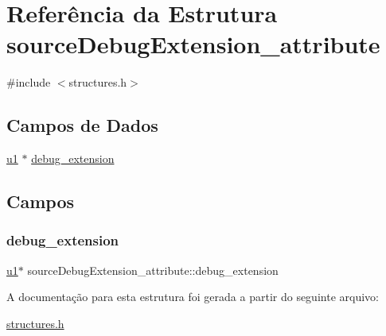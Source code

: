 \hypertarget{structsourceDebugExtension__attribute}{}\section{Referência da Estrutura source\+Debug\+Extension\+\_\+attribute}
\label{structsourceDebugExtension__attribute}


{\ttfamily \#include $<$structures.\+h$>$}

\subsection*{Campos de Dados}
\begin{DoxyCompactItemize}
\item 
\hyperlink{lista__operandos_8h_ad9f4cdb6757615aae2fad89dab3c5470}{u1} $\ast$ \hyperlink{structsourceDebugExtension__attribute_a55b08753a7cc09bf7ca9e4b526445d7f}{debug\+\_\+extension}
\end{DoxyCompactItemize}


\subsection{Campos}
\mbox{\label{structsourceDebugExtension__attribute_a55b08753a7cc09bf7ca9e4b526445d7f}} 
\subsubsection{\texorpdfstring{debug\+\_\+extension}{debug\_extension}}
{\footnotesize\ttfamily \hyperlink{lista__operandos_8h_ad9f4cdb6757615aae2fad89dab3c5470}{u1}$\ast$ source\+Debug\+Extension\+\_\+attribute\+::debug\+\_\+extension}



A documentação para esta estrutura foi gerada a partir do seguinte arquivo\+:\begin{DoxyCompactItemize}
\item 
\hyperlink{structures_8h}{structures.\+h}\end{DoxyCompactItemize}

